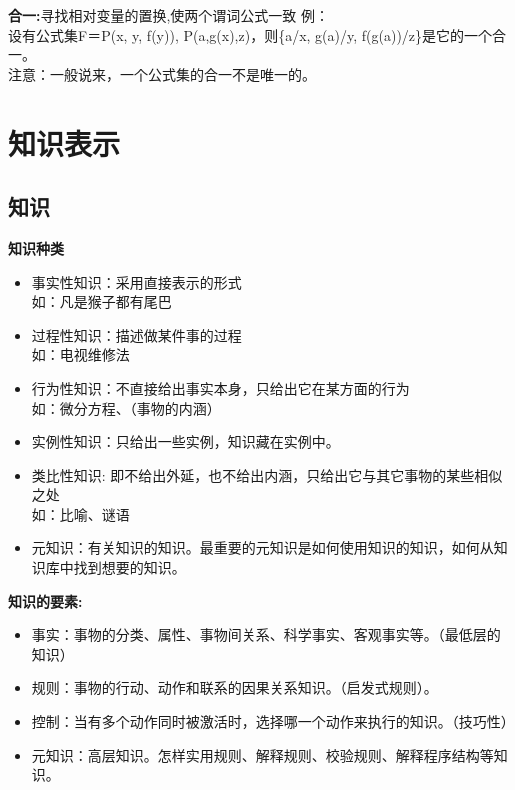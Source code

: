 \documentclass[UTF8,a4paper]{ctexart}
\begin{document}
\textbf{合一:}寻找相对变量的置换,使两个谓词公式一致
例：\\
设有公式集F＝{P(x, y, f(y)), P(a,g(x),z)}，则\{a/x, g(a)/y, f(g(a))/z\}是它的一个合一。\\
注意：一般说来，一个公式集的合一不是唯一的。





\section{知识表示}
\subsection{知识}

\textbf{知识种类}
\begin{itemize}
	\item 事实性知识：采用直接表示的形式\\
	      如：凡是猴子都有尾巴
	\item 过程性知识：描述做某件事的过程\\
	      如：电视维修法
	\item 行为性知识：不直接给出事实本身，只给出它在某方面的行为\\
	      如：微分方程、（事物的内涵）
	\item 实例性知识：只给出一些实例，知识藏在实例中。
	\item 类比性知识: 即不给出外延，也不给出内涵，只给出它与其它事物的某些相似之处 \\
	      如：比喻、谜语
	\item 元知识：有关知识的知识。最重要的元知识是如何使用知识的知识，如何从知识库中找到想要的知识。
\end{itemize}

\textbf{知识的要素:}
\begin{itemize}
	\item 事实：事物的分类、属性、事物间关系、科学事实、客观事实等。（最低层的知识）
	\item 规则：事物的行动、动作和联系的因果关系知识。（启发式规则）。
	\item 控制：当有多个动作同时被激活时，选择哪一个动作来执行的知识。（技巧性）
	\item 元知识：高层知识。怎样实用规则、解释规则、校验规则、解释程序结构等知识。
\end{itemize}
\end{document}
